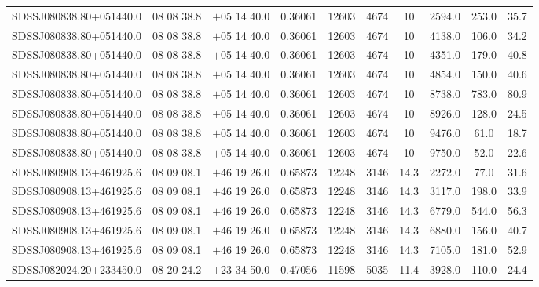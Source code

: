 \begin{landscape}
\begin{center}
\begin{longtable}{l c c c c c c c c c}
SDSSJ080838.80+051440.0  & 08 08 38.8  &         $+$05 14 40.0  &       0.36061  & 12603  &   4674  &       10  &        2594.0  &  253.0  &  35.7  \\
SDSSJ080838.80+051440.0  & 08 08 38.8  &         $+$05 14 40.0  &       0.36061  & 12603  &   4674  &       10  &        4138.0  &  106.0  &  34.2  \\
SDSSJ080838.80+051440.0  & 08 08 38.8  &         $+$05 14 40.0  &       0.36061  & 12603  &   4674  &       10  &        4351.0  &  179.0  &  40.8  \\
SDSSJ080838.80+051440.0  & 08 08 38.8  &         $+$05 14 40.0  &       0.36061  & 12603  &   4674  &       10  &        4854.0  &  150.0  &  40.6  \\
SDSSJ080838.80+051440.0  & 08 08 38.8  &         $+$05 14 40.0  &       0.36061  & 12603  &   4674  &       10  &        8738.0  &  783.0  &  80.9  \\
SDSSJ080838.80+051440.0  & 08 08 38.8  &         $+$05 14 40.0  &       0.36061  & 12603  &   4674  &       10  &        8926.0  &  128.0  &  24.5  \\
SDSSJ080838.80+051440.0  & 08 08 38.8  &         $+$05 14 40.0  &       0.36061  & 12603  &   4674  &       10  &        9476.0  &  61.0  &   18.7  \\
SDSSJ080838.80+051440.0  & 08 08 38.8  &         $+$05 14 40.0  &       0.36061  & 12603  &   4674  &       10  &        9750.0  &  52.0  &   22.6  \\
SDSSJ080908.13+461925.6  & 08 09 08.1  &         $+$46 19 26.0  &       0.65873  & 12248  &   3146  &       14.3  &      2272.0  &  77.0  &   31.6  \\
SDSSJ080908.13+461925.6  & 08 09 08.1  &         $+$46 19 26.0  &       0.65873  & 12248  &   3146  &       14.3  &      3117.0  &  198.0  &  33.9  \\
SDSSJ080908.13+461925.6  & 08 09 08.1  &         $+$46 19 26.0  &       0.65873  & 12248  &   3146  &       14.3  &      6779.0  &  544.0  &  56.3  \\
SDSSJ080908.13+461925.6  & 08 09 08.1  &         $+$46 19 26.0  &       0.65873  & 12248  &   3146  &       14.3  &      6880.0  &  156.0  &  40.7  \\
SDSSJ080908.13+461925.6  & 08 09 08.1  &         $+$46 19 26.0  &       0.65873  & 12248  &   3146  &       14.3  &      7105.0  &  181.0  &  52.9  \\
SDSSJ082024.20+233450.0  & 08 20 24.2  &         $+$23 34 50.0  &       0.47056  & 11598  &   5035  &       11.4  &      3928.0  &  110.0  &  24.4  \\

\end{longtable}
\end{center}
\end{landscape}

